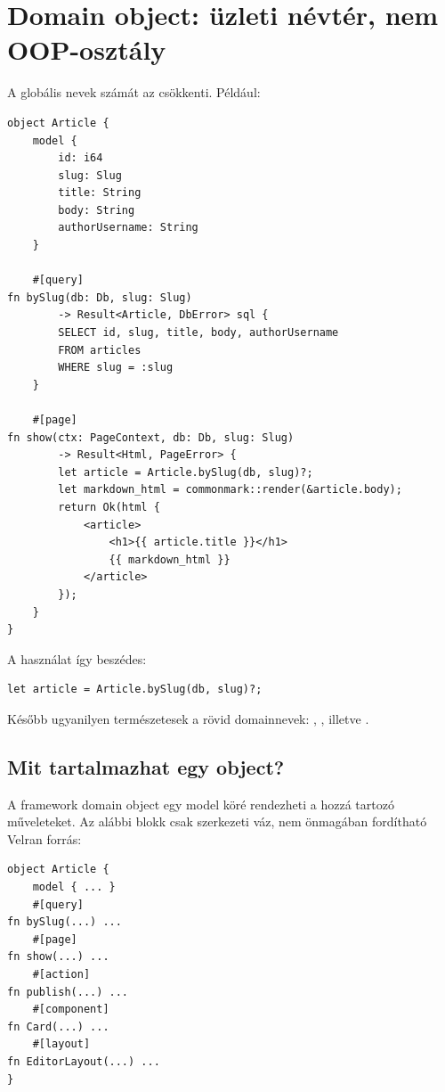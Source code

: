 \section{Domain object: üzleti névtér, nem OOP-osztály}

A globális nevek számát az  csökkenti. Például:

\begin{lstlisting}[language=Velran]
object Article {
    model {
        id: i64
        slug: Slug
        title: String
        body: String
        authorUsername: String
    }

    #[query]
fn bySlug(db: Db, slug: Slug)
        -> Result<Article, DbError> sql {
        SELECT id, slug, title, body, authorUsername
        FROM articles
        WHERE slug = :slug
    }

    #[page]
fn show(ctx: PageContext, db: Db, slug: Slug)
        -> Result<Html, PageError> {
        let article = Article.bySlug(db, slug)?;
        let markdown_html = commonmark::render(&article.body);
        return Ok(html {
            <article>
                <h1>{{ article.title }}</h1>
                {{ markdown_html }}
            </article>
        });
    }
}
\end{lstlisting}

A használat így beszédes:

\begin{lstlisting}[language=Velran]
let article = Article.bySlug(db, slug)?;
\end{lstlisting}

Később ugyanilyen természetesek a rövid domainnevek: , , illetve .

\subsection*{Mit tartalmazhat egy object?}

A framework domain object egy model köré rendezheti a hozzá tartozó műveleteket. Az alábbi blokk csak szerkezeti váz, nem önmagában fordítható Velran forrás:

\begin{lstlisting}
object Article {
    model { ... }
    #[query]
fn bySlug(...) ...
    #[page]
fn show(...) ...
    #[action]
fn publish(...) ...
    #[component]
fn Card(...) ...
    #[layout]
fn EditorLayout(...) ...
}
\end{lstlisting}


